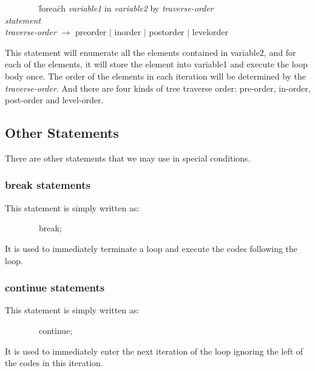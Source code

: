\documentclass[12pt,psfig,a4]{article}
\begin{document}
\begin{code}
\begin{tabbing}
~~~~~~~~\= forea\= ch \textsl{variable1} in \textsl{variable2} by \textsl{traverse-order} \\
\> \> \textsl{statement} \\
\> \textsl{traverse-order} $\rightarrow$ preorder $\mid$ inorder $\mid$ postorder $\mid$ levelorder
\end{tabbing}
\end{code}

This statement will enumerate all the elements contained in variable2, and for each of the elements, it will store the element into variable1 and execute the loop body once. The order of the elements in each iteration will be determined by the \textsl{traverse-order}. And there are four kinds of tree traverse order: pre-order, in-order, post-order and level-order.

\subsection{Other Statements}
There are other statements that we may use in special conditions.

\subsubsection{break statements}
This statement is simply written as:

\begin{code}
\begin{tabbing}
~~~~~~~~break;
\end{tabbing}
\end{code}

It is used to immediately terminate a loop and execute the codes following the loop.

\subsubsection{continue statements}
This statement is simply written as:

\begin{code}
\begin{tabbing}
~~~~~~~~continue;
\end{tabbing}
\end{code}

It is used to immediately enter the next iteration of the loop ignoring the left of the codes in this iteration.
\end{document}
